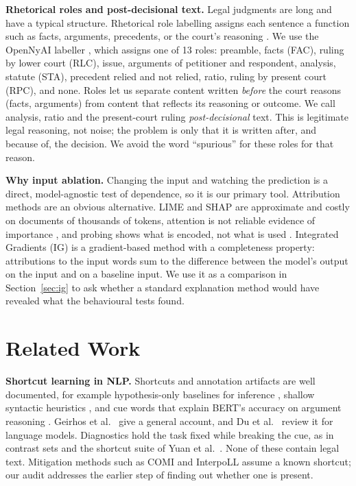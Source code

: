 \documentclass[conference]{IEEEtran}
\begin{document}
\textbf{Rhetorical roles and post-decisional text.} Legal judgments are long and have a typical structure. Rhetorical role labelling assigns each sentence a function such as facts, arguments, precedents, or the court's reasoning \cite{bhattacharya2019identification, nigam2025legalseg}. We use the OpenNyAI labeller \cite{kalamkar2022corpus}, which assigns one of 13 roles: preamble, facts (FAC), ruling by lower court (RLC), issue, arguments of petitioner and respondent, analysis, statute (STA), precedent relied and not relied, ratio, ruling by present court (RPC), and none. Roles let us separate content written \textit{before} the court reasons (facts, arguments) from content that reflects its reasoning or outcome. We call analysis, ratio and the present-court ruling \textit{post-decisional} text. This is legitimate legal reasoning, not noise; the problem is only that it is written after, and because of, the decision. We avoid the word ``spurious'' for these roles for that reason.

\textbf{Why input ablation.} Changing the input and watching the prediction is a direct, model-agnostic test of dependence, so it is our primary tool. Attribution methods are an obvious alternative. LIME \cite{ribeiro2016why} and SHAP \cite{lundberg2017unified} are approximate and costly on documents of thousands of tokens, attention is not reliable evidence of importance \cite{jain2019attention}, and probing shows what is encoded, not what is used \cite{belinkov2022probing}. Integrated Gradients (IG) \cite{sundararajan2017axiomatic} is a gradient-based method with a completeness property: attributions to the input words sum to the difference between the model's output on the input and on a baseline input. We use it as a comparison in Section~\ref{sec:ig} to ask whether a standard explanation method would have revealed what the behavioural tests found.

\section{Related Work}
\label{sec:related}
\textbf{Shortcut learning in NLP.} Shortcuts and annotation artifacts are well documented, for example hypothesis-only baselines for inference \cite{poliak2018hypothesis, gururangan2018annotation}, shallow syntactic heuristics \cite{mccoy2019right}, and cue words that explain BERT's accuracy on argument reasoning \cite{niven2019probing}. Geirhos et al.\ \cite{geirhos2020shortcut} give a general account, and Du et al.\ \cite{du2023shortcut} review it for language models. Diagnostics hold the task fixed while breaking the cue, as in contrast sets \cite{gardner2020contrast} and the shortcut suite of Yuan et al.\ \cite{yuan2024shortcut}. None of these contain legal text. Mitigation methods such as COMI \cite{zhao2024comi} and InterpoLL \cite{korakakis2025interpolated} assume a known shortcut; our audit addresses the earlier step of finding out whether one is present.
\end{document}
